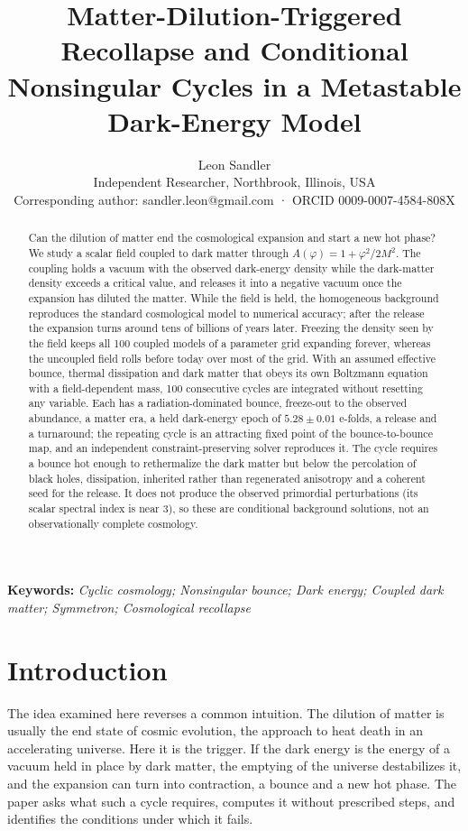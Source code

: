 \documentclass[11pt,a4paper]{article}
\title{Matter-Dilution-Triggered Recollapse and Conditional Nonsingular Cycles in a Metastable Dark-Energy Model}
\author{Leon Sandler \\ Independent Researcher, Northbrook, Illinois, USA \\ Corresponding author: sandler.leon@gmail.com   ·   ORCID 0009-0007-4584-808X}
\date{}
\begin{document}
\maketitle

\begin{abstract}
Can the dilution of matter end the cosmological expansion and start a new hot phase? We study a scalar field coupled to dark matter through $A(\varphi)=1+\varphi^2/2M^2$. The coupling holds a vacuum with the observed dark-energy density while the dark-matter density exceeds a critical value, and releases it into a negative vacuum once the expansion has diluted the matter. While the field is held, the homogeneous background reproduces the standard cosmological model to numerical accuracy; after the release the expansion turns around tens of billions of years later. Freezing the density seen by the field keeps all 100 coupled models of a parameter grid expanding forever, whereas the uncoupled field rolls before today over most of the grid. With an assumed effective bounce, thermal dissipation and dark matter that obeys its own Boltzmann equation with a field-dependent mass, 100 consecutive cycles are integrated without resetting any variable. Each has a radiation-dominated bounce, freeze-out to the observed abundance, a matter era, a held dark-energy epoch of $5.28\pm0.01$ e-folds, a release and a turnaround; the repeating cycle is an attracting fixed point of the bounce-to-bounce map, and an independent constraint-preserving solver reproduces it. The cycle requires a bounce hot enough to rethermalize the dark matter but below the percolation of black holes, dissipation, inherited rather than regenerated anisotropy and a coherent seed for the release. It does not produce the observed primordial perturbations (its scalar spectral index is near 3), so these are conditional background solutions, not an observationally complete cosmology.
\end{abstract}
\noindent\textbf{Keywords:} \emph{Cyclic cosmology; Nonsingular bounce; Dark energy; Coupled dark matter; Symmetron; Cosmological recollapse}

\section{Introduction}
The idea examined here reverses a common intuition. The dilution of matter is usually the end state of cosmic evolution, the approach to heat death in an accelerating universe. Here it is the trigger. If the dark energy is the energy of a vacuum held in place by dark matter, the emptying of the universe destabilizes it, and the expansion can turn into contraction, a bounce and a new hot phase. The paper asks what such a cycle requires, computes it without prescribed steps, and identifies the conditions under which it fails.
\end{document}
